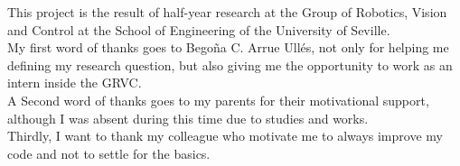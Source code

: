 
This project is the result of half-year research at the Group of Robotics, Vision and Control at the School of Engineering of the University of Seville. \\


My first word of thanks goes to Bego\~na C. Arrue Ull\'es, not only for helping me defining my research question, but also giving me the opportunity to work as an intern inside the GRVC. \\

A Second word of thanks goes to my parents for their motivational support, although I was absent during this time due to studies and works.  \\

Thirdly, I want to thank my colleague who motivate me to always improve my code and not to settle for the basics.  \\

